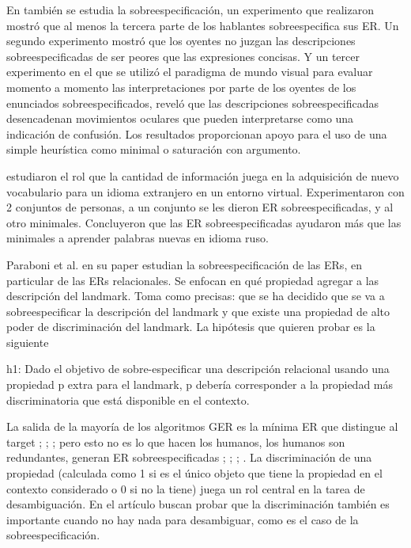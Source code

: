 En \cite{do-speakers} tambi\'en se estudia la sobreespecificaci\'on, un experimento que realizaron mostr\'o que al menos la tercera parte de los hablantes sobreespecifica sus ER. Un segundo experimento mostr\'o que los oyentes no juzgan las descripciones sobreespecificadas de ser peores que las expresiones concisas. Y un tercer experimento en el que se utiliz\'o el paradigma de mundo visual para evaluar momento a momento las interpretaciones por parte de los oyentes de los enunciados sobreespecificados, revel\'o que las descripciones sobreespecificadas desencadenan movimientos oculares que pueden interpretarse como una indicaci\'on de confusi\'on. Los resultados proporcionan apoyo para el uso de una simple heur\'istica como minimal o saturaci\'on con argumento.


\cite{Lu_sasha2015} estudiaron el rol que la cantidad de informaci\'on juega en la adquisici\'on de nuevo vocabulario para un idioma extranjero en un entorno virtual. Experimentaron con 2 conjuntos de personas, a un conjunto se les dieron ER sobreespecificadas, y al otro minimales. Concluyeron que las ER sobreespecificadas ayudaron m\'as que las minimales a aprender palabras nuevas en idioma ruso.


Paraboni et al. en su paper \cite{acl-Paraboni15} estudian la sobreespecificaci\'on de las ERs, en particular de las ERs relacionales.
  Se enfocan en qu\'e propiedad agregar a las descripci\'on del landmark. Toma como precisas:
que se ha decidido que se va a sobreespecificar la descripci\'on del landmark
y que existe una propiedad de alto poder de discriminaci\'on del landmark.
La hip\'otesis que quieren probar es la siguiente

\begin{displayquote}h1: Dado el objetivo de sobre-especificar una descripci\'on relacional usando una propiedad p extra para el landmark, p deber\'ia corresponder a la propiedad m\'as discriminatoria que est\'a disponible en el contexto. 
\end{displayquote}
La salida de la mayor\'ia de los algoritmos GER es la m\'inima ER que distingue al target ; ; ; pero esto no es lo que hacen los humanos, los humanos son redundantes, generan ER sobreespecificadas ; ; ; . La discriminaci\'on de una propiedad (calculada como 1 si es el \'unico objeto que tiene la propiedad en el contexto considerado o 0 si no la tiene) juega un rol central en la tarea de desambiguaci\'on. En el art\'iculo buscan probar que la discriminaci\'on tambi\'en es importante cuando no hay nada para desambiguar, como es el caso de la sobreespecificaci\'on.


